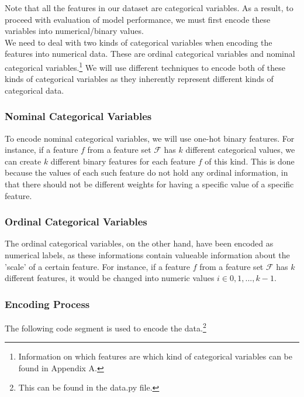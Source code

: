 \documentclass[fleqn]{article}
\begin{document}
    Note that all the features in our dataset are categorical variables. As a result, to
    proceed with evaluation of model performance, we must first encode these variables
    into numerical/binary values.\\

    We need to deal with two kinds of categorical variables when encoding the features
    into numerical data. These are ordinal categorical variables and nominal categorical
    variables.\footnote{Information on which features are which kind of categorical
    variables can be found in Appendix A.} We will use different techniques to encode
    both of these kinds of categorical variables as they inherently represent different
    kinds of categorical data.

    \subsubsection{Nominal Categorical Variables}

    To encode nominal categorical variables, we will use one-hot binary features. For
    instance, if a feature $ f $ from a feature set $ \mathcal{F} $ has $ k $ different
    categorical values, we can create $ k $ different binary features for each feature
    $ f $ of this kind. This is done because the values of each such feature do not hold
    any ordinal information, in that there should not be different weights for having a
    specific value of a specific feature.

    \subsubsection{Ordinal Categorical Variables}

    The ordinal categorical variables, on the other hand, have been encoded as numerical
    labels, as these informations contain valueable information about the 'scale' of a
    certain feature. For instance, if a feature $ f $ from a feature set $ \mathcal{F} $
    has $ k $ different features, it would be changed into numeric values
    $ i \in 0,1,...,k-1$.

    \subsubsection{Encoding Process}

    The following code segment is used to encode the data.\footnote{This can be found in
    the data.py file.}
\end{document}
